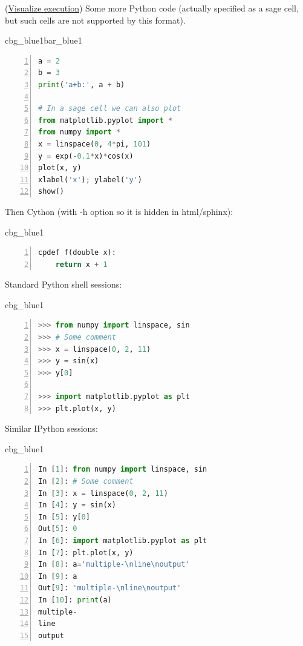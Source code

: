 \documentclass[%
oneside,                 %
final,                   %
10pt]{article}
\newenvironment{_cod_tight}[1]{
   \def\FrameCommand{\colorbox{#1}}
   \FrameRule0.6pt\MakeFramed {\FrameRestore}\vskip3mm}
   {\vskip0mm\endMakeFramed}
\newenvironment{cod}[1]{
\bgroup\rmfamily
\fboxsep=0mm\relax
\begin{_cod_tight}{#1}
\list{}{\parsep=-2mm\parskip=0mm\topsep=0pt\leftmargin=2mm
\rightmargin=2\leftmargin\leftmargin=4pt\relax}
\item\relax}
{\endlist\end{_cod_tight}\egroup}
\newenvironment{_pro_tight}[2]{
   \def\FrameCommand{\color{#2}\vrule width 1mm\normalcolor\colorbox{#1}}
   \FrameRule0.6pt\MakeFramed {\advance\hsize-2mm\FrameRestore}\vskip3mm}
   {\vskip0mm\endMakeFramed}
\newenvironment{pro}[2]{
\bgroup\rmfamily
\fboxsep=0mm\relax
\begin{_pro_tight}{#1}{#2}
\list{}{\parsep=-2mm\parskip=0mm\topsep=0pt\leftmargin=2mm
\rightmargin=2\leftmargin\leftmargin=4pt\relax}
\item\relax}
{\endlist\end{_pro_tight}\egroup}
\theoremstyle{definition}
\begin{document}
\noindent
(\href{{https://pythontutor.com/visualize.html\#code=class+Line\%3A\%0A++++def+__init__\%28self\%2C+a\%2C+b\%29\%3A\%0A++++++++self.a\%2C+self.b+\%3D+a\%2C+b\%0A\%0A++++def+__call__\%28self\%2C+x\%29\%3A\%0A++++++++a\%2C+b+\%3D+self.a\%2C+self.b\%0A++++++++return+a\%2Ax+\%2B+b\%0A\%0Aline+\%3D+Line\%282\%2C+1\%29\%0Ay+\%3D+line\%28x\%3D3\%29\%0Aprint\%28y\%29&mode=display&cumulative=false&heapPrimitives=false&drawParentPointers=false&textReferences=false&py=2&curInstr=0}}{Visualize execution}) 
Some more Python code (actually specified as a sage cell, but
such cells are not supported by this format).
\begin{pro}{cbg_blue1}{bar_blue1}\begin{lstlisting}[language=Python,style=myspeciallststyle,numbers=left,numberstyle=\tiny,stepnumber=3,numbersep=15pt,xleftmargin=1mm]
a = 2
b = 3
print('a+b:', a + b)

# In a sage cell we can also plot
from matplotlib.pyplot import *
from numpy import *
x = linspace(0, 4*pi, 101)
y = exp(-0.1*x)*cos(x)
plot(x, y)
xlabel('x'); ylabel('y')
show()

\end{lstlisting}\end{pro}
\noindent

Then Cython (with -h option so it is hidden in html/sphinx):
\begin{cod}{cbg_blue1}\begin{lstlisting}[language=Python,style=myspeciallststyle,numbers=left,numberstyle=\tiny,stepnumber=3,numbersep=15pt,xleftmargin=1mm]
cpdef f(double x):
    return x + 1

\end{lstlisting}\end{cod}
\noindent

Standard Python shell sessions:
\begin{cod}{cbg_blue1}\begin{lstlisting}[language=Python,style=myspeciallststyle,numbers=left,numberstyle=\tiny,stepnumber=3,numbersep=15pt,xleftmargin=1mm]
>>> from numpy import linspace, sin
>>> # Some comment
>>> x = linspace(0, 2, 11)
>>> y = sin(x)
>>> y[0]

>>> import matplotlib.pyplot as plt
>>> plt.plot(x, y)

\end{lstlisting}\end{cod}
\noindent

Similar IPython sessions:
\begin{cod}{cbg_blue1}\begin{lstlisting}[language=Python,style=myspeciallststyle,numbers=left,numberstyle=\tiny,stepnumber=3,numbersep=15pt,xleftmargin=1mm]
In [1]: from numpy import linspace, sin
In [2]: # Some comment
In [3]: x = linspace(0, 2, 11)
In [4]: y = sin(x)
In [5]: y[0]
Out[5]: 0
In [6]: import matplotlib.pyplot as plt
In [7]: plt.plot(x, y)
In [8]: a='multiple-\nline\noutput'
In [9]: a
Out[9]: 'multiple-\nline\noutput'
In [10]: print(a)
multiple-
line
output

\end{lstlisting}\end{cod}
\noindent
\end{document}
